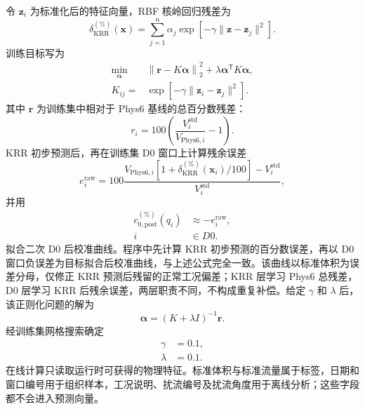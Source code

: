 令 $\boldsymbol{z}_i$ 为标准化后的特征向量，RBF 核岭回归残差为\cite{Scholkopf2002LearningKernels}
\begin{equation}
\delta_{\mathrm{KRR}}^{(\%)}(\boldsymbol{x})
=\sum_{j=1}^{n}\alpha_j
\exp\left[-\gamma\|\boldsymbol{z}-\boldsymbol{z}_j\|^2\right].
\end{equation}
训练目标写为
\begin{equation}
\begin{aligned}
\min_{\boldsymbol{\alpha}}\quad&
\left\|\boldsymbol r-K\boldsymbol{\alpha}\right\|_2^2
+\lambda\boldsymbol{\alpha}^{\mathsf T}K\boldsymbol{\alpha},\\
K_{ij}={}&\exp\left[-\gamma\|\boldsymbol z_i-\boldsymbol z_j\|^2\right].
\end{aligned}
\end{equation}
其中 $\boldsymbol r$ 为训练集中相对于 Phys6 基线的总百分数残差：
\begin{equation}
r_i=100\left(\frac{V_i^{\mathrm{std}}}{V_{\mathrm{Phys6},i}}-1\right).
\end{equation}
KRR 初步预测后，再在训练集 D0 窗口上计算残余误差
\begin{equation}
e_i^{\mathrm{raw}}
=100\frac{
V_{\mathrm{Phys6},i}\left[1+
\delta_{\mathrm{KRR}}^{(\%)}(\boldsymbol{x}_i)/100\right]
-V_i^{\mathrm{std}}}{V_i^{\mathrm{std}}},
\end{equation}
并用
\begin{equation}
\begin{aligned}
c_{0,\mathrm{post}}^{(\%)}(q_i)
&\approx -e_i^{\mathrm{raw}},\\
i&\in D0.
\end{aligned}
\end{equation}
拟合二次 D0 后校准曲线。程序中先计算 KRR 初步预测的百分数误差，再以 D0 窗口负误差为目标拟合后校准曲线，与上述公式完全一致。该曲线以标准体积为误差分母，仅修正 KRR 预测后残留的正常工况偏差；KRR 层学习 Phys6 总残差，D0 层学习 KRR 后残余误差，两层职责不同，不构成重复补偿。给定 $\gamma$ 和 $\lambda$ 后，该正则化问题的解为
\begin{equation}
\boldsymbol{\alpha}=(K+\lambda I)^{-1}\boldsymbol r.
\end{equation}
经训练集网格搜索确定
\begin{equation}
\begin{aligned}
\gamma&=0.1,\\
\lambda&=0.1.
\end{aligned}
\end{equation}
在线计算只读取运行时可获得的物理特征。标准体积与标准流量属于标签，日期和窗口编号用于组织样本，工况说明、扰流编号及扰流角度用于离线分析；这些字段都不会进入预测向量。

